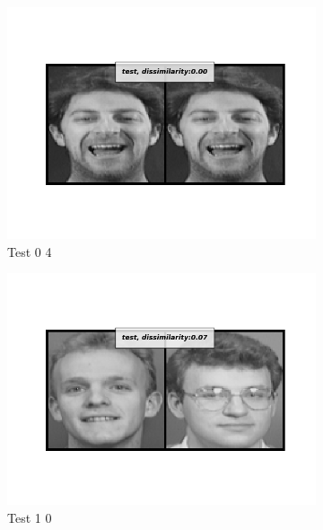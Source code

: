 \documentclass[12pt]{article}
\begin{document}
\begin{figure}[htbp]
\begin{subfigure}[t]{0.48\textwidth}
        \centering
        \includegraphics[scale=0.5,trim={1in 1in 1in 1in},clip]{./Homework3/output/siamese/test_0_8.png}
        \caption{Test 0 4}
    \label{hw3p3e}
    \end{subfigure}
    \begin{subfigure}[t]{0.48\textwidth}
        \centering
        \includegraphics[scale=0.5,trim={1in 1in 1in 1in},clip]{./Homework3/output/siamese/test_1_0.png}
        \caption{Test 1 0}
    \label{hw3p3f}
    \end{subfigure}
    \begin{subfigure}[t]{0.48\textwidth}
        \centering

\end{subfigure}
\end{figure}
\end{document}
